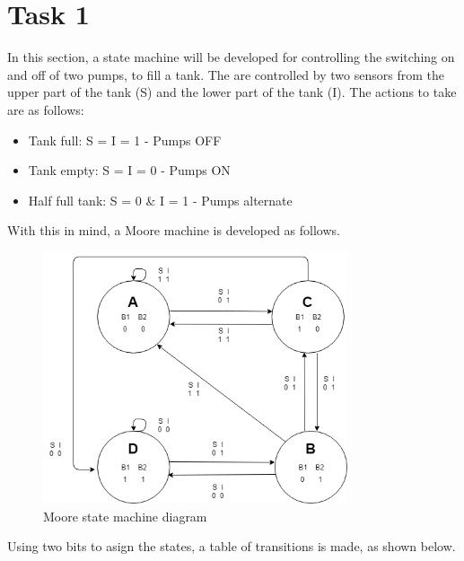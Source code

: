 \newpage
\section*{Task 1}

In this section, a state machine will be 
developed for controlling the switching
on and off of two pumps, to fill a tank.
The are controlled by two sensors from 
the upper part of the tank (S) and the 
lower part of the tank (I). The actions
to take are as follows:

\begin{itemize}
    \item Tank full: S = I = 1 - Pumps OFF
    \item Tank empty: S = I = 0 - Pumps ON
    \item Half full tank: S = 0 \& I = 1 - Pumps alternate 
\end{itemize}

With this in mind, a Moore machine is 
developed as follows.

\begin{figure}[H]
    \begin{centering}
    \includegraphics[width=0.8\textwidth]{data/Graficos1/1a_fsm.png}
    \par\end{centering}
    \caption{Moore state machine diagram}
\end{figure}

Using two bits to asign the states, a table 
of transitions is made, as shown below.

